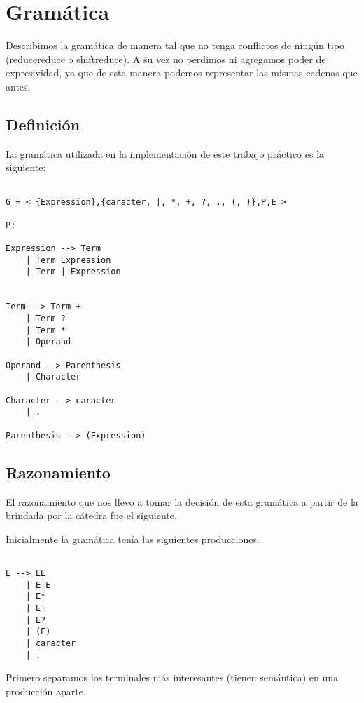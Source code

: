 \section{Gramática}

Describimos la gramática de manera tal que no tenga conflictos de ningún tipo 
(reduce\/reduce o shift\/reduce). A su vez no perdimos ni agregamos poder de 
expresividad, ya que de esta manera podemos representar las mismas cadenas que 
antes. 

\subsection{Definición}

La gramática utilizada en la implementación de este trabajo práctico es la siguiente:

\begin{lstlisting}

G = < {Expression},{caracter, |, *, +, ?, ., (, )},P,E >

P:

Expression --> Term        
    | Term Expression      
    | Term | Expression    

    
Term --> Term + 
    | Term ? 
    | Term *
    | Operand

Operand --> Parenthesis  
    | Character       

Character --> caracter    
    | .

Parenthesis --> (Expression)

\end{lstlisting}


\subsection{Razonamiento}

El razonamiento que nos llevo a tomar la decisión de esta gramática a partir 
de la brindada por la cátedra fue el siguiente.

Inicialmente la gramática tenía las siguientes producciones.

\begin{lstlisting}

E --> EE
    | E|E
    | E*
    | E+
    | E?
    | (E)
    | caracter
    | .

\end{lstlisting}

Primero separamos los terminales más interesantes (tienen semántica) en una producción aparte. 


